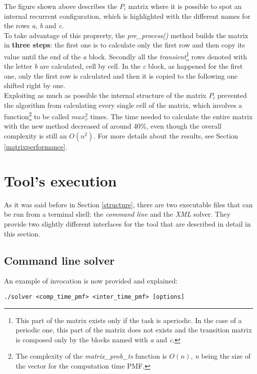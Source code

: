 The figure shown above describes the \( P_{i} \) matrix where it is possible to spot an internal recurrent configuration, which is highlighted with the different names for the rows \emph{a}, \emph{b} and \emph{c}.\\
To take advantage of this proprerty, the \emph{pre\_process()} method builds the matrix in \textbf{three steps}: the first one is to calculate only the first row and then copy its value until the end of the \emph{a} block. Secondly all the \emph{transient}\footnote{This part of the matrix exists only if the task is aperiodic. In the case of a periodic one, this part of the matrix does not exists and the transition matrix is composed only by the blocks named with \emph{a} and \emph{c}.} rows denoted with the letter \emph{b} are calculated, cell by cell. In the \emph{c} block, as happened for the first one, only the first row is calculated and then it is copied to the following one shifted right by one.\\
Exploiting as much as possible the internal structure of the matrix \( P_{i} \) prevented the algorithm from calculating every single cell of the matrix, which involves a function\footnote{The complexity of the \emph{matrix\_prob\_ts} function is \( O(n) \), \emph{n} being the size of the vector for the computation time PMF.} to be called \( max_{v}^{2} \) times. The time needed to calculate the entire matrix with the new method decreased of around 40\%, even though the overall complexity is still an \( O(n^{2}) \). For more details about the results, see Section \ref{matrixperformance}.

\section{Tool's execution}
As it was said before in Section \ref{structure}, there are two executable files that can be run from a terminal shell: the \emph{command line} and the \emph{XML} solver. They provide two slightly different interfaces for the tool that are described in detail in this section.

\subsection{Command line solver}
An example of invocation is now provided and explained:
\begin{lstlisting}[frame=bt, numbers=none]
  ./solver <comp_time_pmf> <inter_time_pmf> [options]
\end{lstlisting}    


